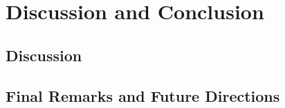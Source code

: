 \chapter{Discussion and Conclusion}
\section{Discussion}

\section{Final Remarks and Future Directions}

